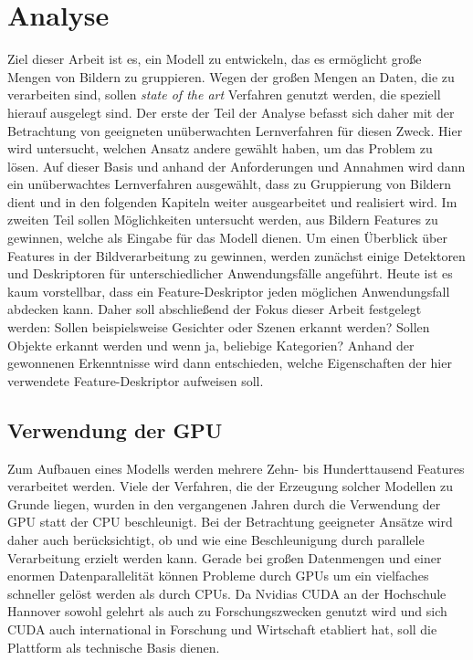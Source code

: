 \chapter{Analyse}

Ziel dieser Arbeit ist es, ein Modell zu entwickeln, das es ermöglicht große Mengen von Bildern zu gruppieren. Wegen der großen Mengen an Daten, die zu verarbeiten sind, sollen \textit{state of the art} Verfahren genutzt werden, die speziell hierauf ausgelegt sind. Der erste der Teil der Analyse befasst sich daher mit der Betrachtung von geeigneten unüberwachten Lernverfahren für diesen Zweck. Hier wird untersucht, welchen Ansatz andere gewählt haben, um das Problem zu lösen. Auf dieser Basis und anhand der Anforderungen und Annahmen wird dann ein unüberwachtes Lernverfahren ausgewählt, dass zu Gruppierung von Bildern dient und in den folgenden Kapiteln weiter ausgearbeitet und realisiert wird. \newline
Im zweiten Teil sollen Möglichkeiten untersucht werden, aus Bildern Features zu gewinnen, welche als Eingabe für das Modell dienen. Um einen Überblick über Features in der Bildverarbeitung zu gewinnen, werden zunächst einige Detektoren und Deskriptoren für unterschiedlicher Anwendungsfälle angeführt. Heute ist es kaum vorstellbar, dass ein Feature-Deskriptor jeden möglichen Anwendungsfall abdecken kann. Daher soll abschließend der Fokus dieser Arbeit festgelegt werden: Sollen beispielsweise Gesichter oder Szenen erkannt werden? Sollen Objekte erkannt werden und wenn ja, beliebige Kategorien? Anhand der gewonnenen Erkenntnisse wird dann entschieden, welche Eigenschaften der hier verwendete Feature-Deskriptor aufweisen soll. 

\section{Verwendung der GPU}

Zum Aufbauen eines Modells werden mehrere Zehn- bis Hunderttausend Features verarbeitet werden. Viele der Verfahren, die der Erzeugung solcher Modellen zu Grunde liegen, wurden in den vergangenen Jahren durch die Verwendung der GPU statt der CPU beschleunigt. Bei der Betrachtung geeigneter Ansätze wird daher auch berücksichtigt, ob und wie eine Beschleunigung durch parallele Verarbeitung erzielt werden kann. Gerade bei großen Datenmengen und einer enormen Datenparallelität können Probleme durch GPUs um ein vielfaches schneller gelöst werden als durch CPUs. Da Nvidias CUDA an der Hochschule Hannover sowohl gelehrt als auch zu Forschungszwecken genutzt wird und sich CUDA auch international in Forschung und Wirtschaft etabliert hat, soll die Plattform als technische Basis dienen. 

